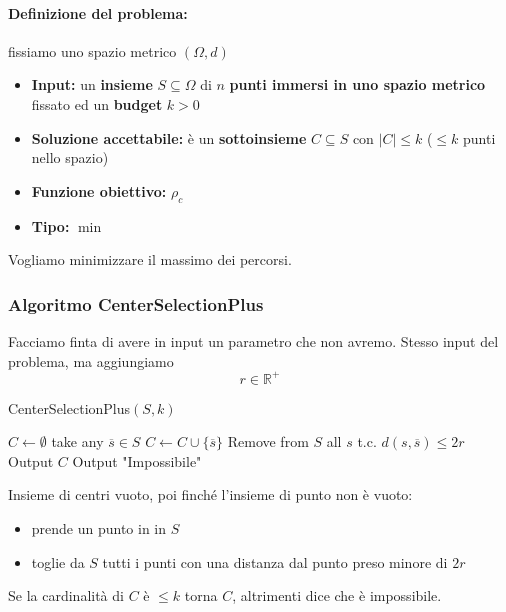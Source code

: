 \paragraph{Definizione del problema:} fissiamo uno spazio metrico $(\Omega, d)$
\begin{itemize}
	\item \textbf{Input:} un \textbf{insieme} $S \subseteq \Omega$ di $n$ \textbf{punti immersi in uno spazio metrico} fissato ed un \textbf{budget} $k>0$
	
	\item \textbf{Soluzione accettabile:} è un \textbf{sottoinsieme} $C \subseteq S$ con $|C| \leq k$ ($\leq k$ punti nello spazio)
	
	\item \textbf{Funzione obiettivo:} $\rho_c$
	
	\item \textbf{Tipo:} $\min$
\end{itemize}
Vogliamo minimizzare il massimo dei percorsi.\\

\subsubsection{Algoritmo CenterSelectionPlus} 
Facciamo finta di avere in input un parametro che non avremo. Stesso input del problema, ma aggiungiamo 
$$ r \in \mathbb{R}^+ $$

\begin{algorithm}
	\caption{CenterSelectionPlus$(S, k)$}
	\begin{algorithmic}
		\STATE $C \leftarrow \emptyset$
		\STATE take any $\overline{s} \in S$
		\STATE $C \leftarrow C \cup \{\overline{s}\}$
		\STATE Remove from $S$ all $s$ t.c. $d(s, \overline{s}) \leq 2r$
		\ENDWHILE
		\STATE Output $C$
		\ELSE
		\STATE Output "Impossibile"
		\ENDIF
	\end{algorithmic}
\end{algorithm}

Insieme di centri vuoto, poi finché l'insieme di punto non è vuoto: 
\begin{itemize}
	\item prende un punto in in $S$
	\item toglie da $S$ tutti i punti con una distanza dal punto preso minore di $2r$
\end{itemize}

Se la cardinalità di $C$ è $\leq k$ torna $C$, altrimenti dice che è impossibile.\\

